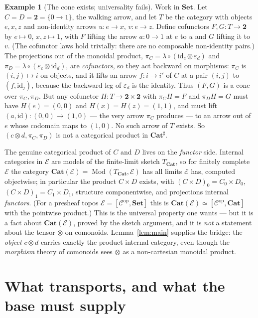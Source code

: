 \documentclass[11pt]{amsart}
\theoremstyle{plain}
\theoremstyle{definition}
\newtheorem{example}[theorem]{Example}
\theoremstyle{remark}
\newcommand{\Set}{\mathbf{Set}}
\newcommand{\Cat}{\mathbf{Cat}}
\newcommand{\Ee}{\mathcal{E}}
\newcommand{\id}{\mathrm{id}}
\DeclareMathOperator{\Mod}{Mod}
\begin{document}
\begin{example}[The cone exists; universality fails]\label{ex:walking}
Work in $\Set$. Let $C=D=\mathbf 2=\{0\to1\}$, the walking arrow, and let $T$ be the category with
objects $e,x,z$ and non-identity arrows $u:e\to x$, $v:e\to z$. Define cofunctors $F,G:T\to\mathbf2$
by $e\mapsto0$, $x,z\mapsto1$, with $F$ lifting the arrow $a:0\to1$ at $e$ to $u$ and $G$ lifting it
to $v$. (The cofunctor laws hold trivially: there are no composable non-identity pairs.) The
projections out of the monoidal product, $\pi_C=\lambda\circ(\id_c\otimes\varepsilon_d)$ and
$\pi_D=\lambda\circ(\varepsilon_c\otimes\id_d)$, are \emph{cofunctors}, so they act backward on
morphisms: $\pi_C$ is $(i,j)\mapsto i$ on objects, and it lifts an arrow $f:i\to i'$ of $C$ at a pair
$(i,j)$ to $(f,\id_j)$, because the backward leg of $\varepsilon_d$ is the identity. Thus $(F,G)$ is a
cone over $\pi_C,\pi_D$. But any cofunctor $H:T\to\mathbf2\times\mathbf2$ with $\pi_C H=F$ and
$\pi_D H=G$ must have $H(e)=(0,0)$ and $H(x)=H(z)=(1,1)$, and must lift $(a,\id):(0,0)\to(1,0)$ ---
the very arrow $\pi_C$ produces --- to an arrow out of $e$ whose codomain maps to $(1,0)$. No such
arrow of $T$ exists. So $(c\otimes d,\pi_C,\pi_D)$ is not a categorical product in $\Cat^{\sharp}$.
\end{example}

The genuine categorical product of $C$ and $D$ lives on the \emph{functor} side. Internal categories
in $\Ee$ are models of the finite-limit sketch $T_{\Cat}$, so for finitely complete $\Ee$ the category
$\Cat(\Ee)=\Mod(T_{\Cat},\Ee)$ has all limits $\Ee$ has, computed objectwise; in particular the
product $C\times D$ exists, with $(C\times D)_0=C_0\times D_0$, $(C\times D)_1=C_1\times D_1$,
structure componentwise, and projections internal \emph{functors}. (For a presheaf topos
$\Ee=[\mathcal C^{\mathrm{op}},\Set]$ this is $\Cat(\Ee)\simeq[\mathcal C^{\mathrm{op}},\Cat]$ with the
pointwise product.) This is the universal property one wants --- but it is a fact about $\Cat(\Ee)$,
proved by the sketch argument, and it is \emph{not} a statement about the tensor $\otimes$ on
comonoids. Lemma~\ref{lem:main} supplies the bridge: the \emph{object} $c\otimes d$ carries exactly
the product internal category, even though the \emph{morphism} theory of comonoids sees $\otimes$ as a
non-cartesian monoidal product.

\section{What transports, and what the base must supply}\label{sec:transport}
\end{document}
